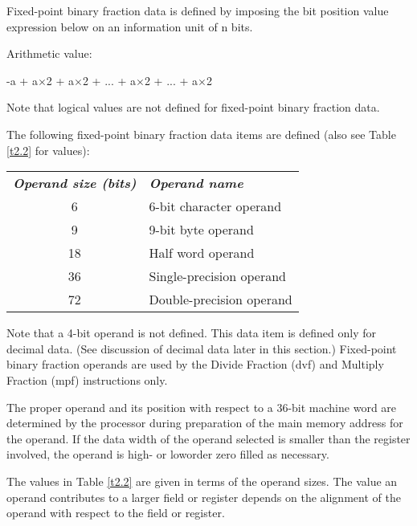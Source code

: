 Fixed-point binary fraction data is defined by imposing the bit position value
expression below on an information unit of n bits.

Arithmetic value:

\hspace{1em} -a + a$\times$2 + a$\times$2 + ... + a$\times$2 + ... + a$\times$2

Note that logical values are not defined for fixed-point binary fraction data.

The following fixed-point binary fraction data items are defined (also see
Table \ref{t2.2} for values):

\begin{tabular}{ c l }
\textbf{\textit{Operand size (bits)}} & \textbf{\textit{Operand name}} \\
6 & 6-bit character operand \\
9 & 9-bit byte operand \\
18 & Half word operand \\
36 & Single-precision operand \\
72 & Double-precision operand \\
\end{tabular}

Note that a 4-bit operand is not defined. This data item is defined only for
decimal data.  (See discussion of decimal data later in this section.)
Fixed-point binary fraction operands are used by the Divide Fraction (dvf) and
Multiply Fraction (mpf) instructions only.

The proper operand and its position with respect to a 36-bit machine word are
determined by the processor during preparation of the main memory address for
the operand. If the data width of the operand selected is smaller than the
register involved, the operand is high- or loworder zero filled as necessary.  

The values in Table \ref{t2.2} are given in terms of the operand sizes. The
value an operand contributes to a larger field or register depends on the
alignment of the operand with respect to the field or register.  


